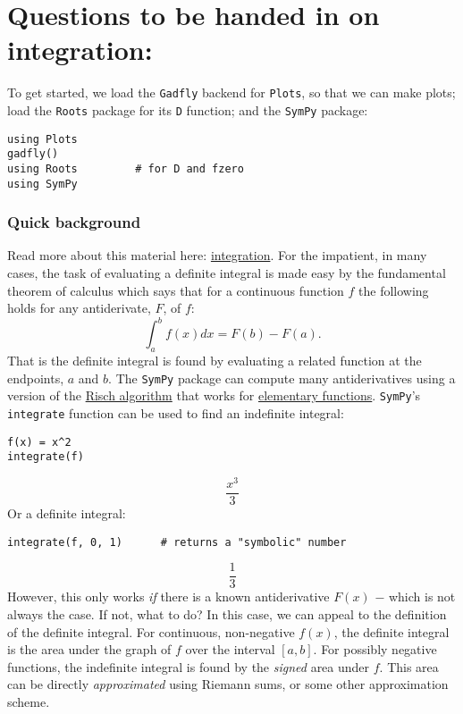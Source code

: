 \documentclass[12pt]{article}
\begin{document}
\section{Questions to be handed in on integration:}\newline
To get started, we load the \texttt{Gadfly} backend for \texttt{Plots}, so that we can make plots; load the \texttt{Roots} package for its \texttt{D} function; and the \texttt{SymPy} package:\begin{verbatim}
using Plots
gadfly()
using Roots			# for D and fzero
using SymPy
\end{verbatim}
\subsubsection{Quick background}\newline
Read more about this material here: \href{http://mth229.github.io/integration.html}{integration}.\newline
For the impatient, in many cases, the task of evaluating a definite integral is made easy by the fundamental theorem of calculus which says that for a continuous function $f$ the following holds for any antiderivate, $F$, of $f$:
$$
\int_a^b f(x) dx = F(b) - F(a).
$$
\newline
That is the definite integral is found by evaluating a related function at the endpoints, $a$ and $b$.\newline
The \texttt{SymPy} package can compute many antiderivatives using a version of the \href{http://en.wikipedia.org/wiki/Risch\_algorithm}{Risch algorithm} that works for \href{http://en.wikipedia.org/wiki/Elementary\_function}{elementary functions}. \texttt{SymPy}'s \texttt{integrate} function can be used to find an indefinite integral:\begin{verbatim}
f(x) = x^2
integrate(f)
\end{verbatim}
$$\frac{x^{3}}{3}$$\newline
Or a definite integral:\begin{verbatim}
integrate(f, 0, 1)		# returns a "symbolic" number
\end{verbatim}
$$\frac{1}{3}$$\newline
However, this only works \textit{if} there is a known antiderivative $F(x)$ $-$ which is not always the case. If not, what to do?\newline
In this case, we can appeal to the definition of the definite integral. For continuous, non-negative $f(x)$, the definite integral is the area under the graph of $f$ over the interval $[a,b]$. For possibly negative functions, the indefinite integral is found by the \textit{signed} area under $f$.  This area can be directly \textit{approximated} using Riemann sums, or some other approximation scheme.\newline
\end{document}

